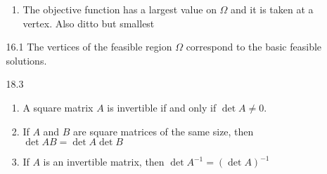 \documentclass{article}
\begin{document}
\begin{multicols}{2}
\begin{itemize}[leftmargin=0.5cm]
\begin{enumerate}
\begin{enumerate}
                    \item The objective function has a largest value on $\Omega$ and it is taken at a vertex. Also ditto but smallest
                \end{enumerate}
            \item[16.1] The vertices of the feasible region $\Omega$ correspond to the basic feasible solutions.
            \item[18.3] \begin{enumerate}
                \item A square matrix $A$ is invertible if and only if $\det{A}\neq0$.
                \item If $A$ and $B$ are square matrices of the same size, then $\det{AB}=\det{A}\det{B}$
                \item If $A$ is an invertible matrix, then $\det{A^{-1}}=(\det{A})^{-1}$
            \end{enumerate}
         \end{enumerate}

    
\end{itemize}
\end{multicols}

\pagebreak
\end{document}
